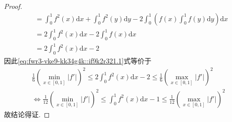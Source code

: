 \documentclass[../../main.tex]{subfiles}%
\begin{document}
\begin{proof}
\begin{align*}
&= \int_0^1 f^2(x) \mathrm{d}x + \int_0^1 f^2(y) \mathrm{d}y - 2 \int_0^1 \left( f(x) \int_0^1 f(y) \mathrm{d}y \right) \mathrm{d}x \\
&= 2 \int_0^1 f^2(x) \mathrm{d}x - 2 \int_0^1 f(x) \mathrm{d}x \\
&= 2 \int_0^1 f^2(x) \mathrm{d}x - 2
\end{align*}
因此\eqref{eq:fwr3-vke9-kk34g4k::if9k2r321.1}式等价于
\begin{align*}
\frac{1}{6} \left( \min\limits_{x\in[0,1]} |f'| \right)^2 \leqslant 2 \int_0^1 f^2(x) \mathrm{d}x - 2 \leqslant \frac{1}{6} \left( \max\limits_{x\in[0,1]} |f'| \right)^2 \\
\Longleftrightarrow \frac{1}{12} \left( \min\limits_{x\in[0,1]} |f'| \right)^2 \leqslant \int_0^1 f^2(x) \mathrm{d}x - 1 \leqslant \frac{1}{12} \left( \max\limits_{x\in[0,1]} |f'| \right)^2
\end{align*}
故结论得证.
\end{proof}
\end{document}
